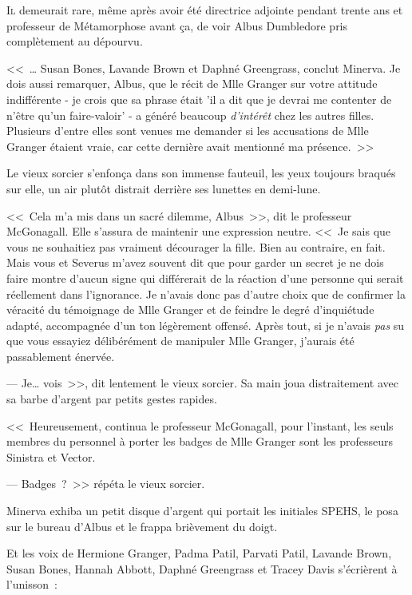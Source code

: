 
\lettrine{I}{l} demeurait rare, même après avoir été directrice adjointe pendant trente ans et professeur de Métamorphose avant ça, de voir Albus Dumbledore pris complètement au dépourvu.

<<~… Susan Bones, Lavande Brown et Daphné Greengrass, conclut Minerva. Je dois aussi remarquer, Albus, que le récit de Mlle Granger sur votre attitude indifférente - je crois que sa phrase était 'il a dit que je devrai me contenter de n'être qu'un faire-valoir' - a généré beaucoup \emph{d'intérêt} chez les autres filles. Plusieurs d'entre elles sont venues me demander si les accusations de Mlle Granger étaient vraie, car cette dernière avait mentionné ma présence.~>>

Le vieux sorcier s'enfonça dans son immense fauteuil, les yeux toujours braqués sur elle, un air plutôt distrait derrière ses lunettes en demi-lune.

<<~Cela m'a mis dans un sacré dilemme, Albus~>>, dit le professeur McGonagall. Elle s'assura de maintenir une expression neutre. <<~Je sais que vous ne souhaitiez pas vraiment décourager la fille. Bien au contraire, en fait. Mais vous et Severus m'avez souvent dit que pour garder un secret je ne dois faire montre d'aucun signe qui différerait de la réaction d'une personne qui serait réellement dans l'ignorance. Je n'avais donc pas d'autre choix que de confirmer la véracité du témoignage de Mlle Granger et de feindre le degré d'inquiétude adapté, accompagnée d'un ton légèrement offensé. Après tout, si je n'avais \emph{pas} su que vous essayiez délibérément de manipuler Mlle Granger, j'aurais été passablement énervée.

--- Je… vois~>>, dit lentement le vieux sorcier. Sa main joua distraitement avec sa barbe d'argent par petits gestes rapides.

<<~Heureusement, continua le professeur McGonagall, pour l'instant, les seuls membres du personnel à porter les badges de Mlle Granger sont les professeurs Sinistra et Vector.

--- Badges~?~>> répéta le vieux sorcier.

Minerva exhiba un petit disque d'argent qui portait les initiales SPEHS, le posa sur le bureau d'Albus et le frappa brièvement du doigt.

Et les voix de Hermione Granger, Padma Patil, Parvati Patil, Lavande Brown, Susan Bones, Hannah Abbott, Daphné Greengrass et Tracey Davis s'écrièrent à l'unisson~:

